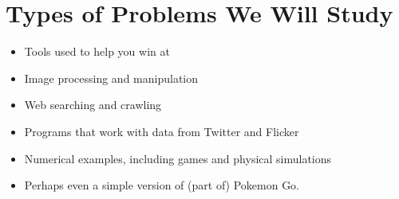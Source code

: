 \documentclass[letterpaper,10pt,english]{sphinxmanual}
\begin{document}
\section{Types of Problems We Will Study}
\label{\detokenize{lecture_notes/lec01_intro:types-of-problems-we-will-study}}\begin{itemize}
\item {} 
Tools used to help you win at 

\item {} 
Image processing and manipulation

\item {} 
Web searching and crawling

\item {} 
Programs that work with data from Twitter and Flicker

\item {} 
Numerical examples, including games and physical simulations

\item {} 
Perhaps even a simple version of (part of) Pokemon Go.

\end{itemize}
\end{document}
